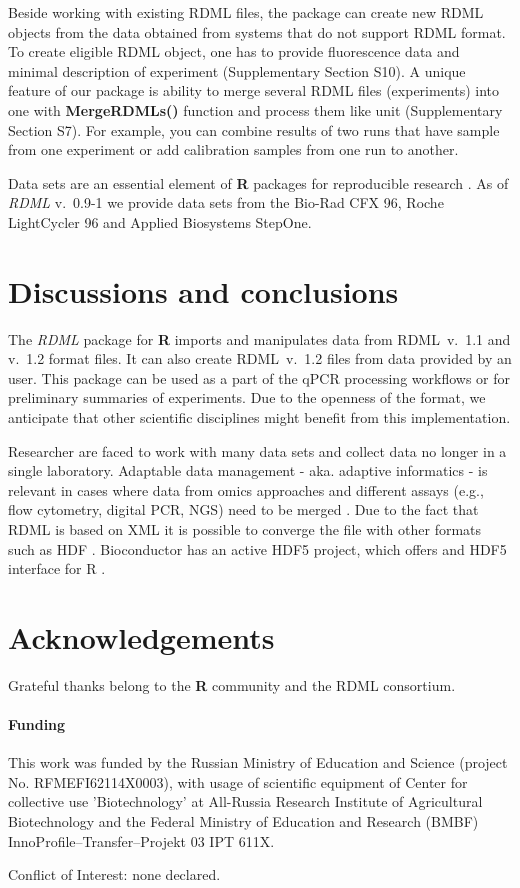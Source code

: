 \documentclass{bioinfo}
\begin{document}
	Beside working with existing RDML files, the package can create new RDML 
objects from the data obtained from systems that do not support RDML format. To 
create eligible RDML object, one has to provide fluorescence data and minimal 
description of experiment (Supplementary Section S10). A unique feature of our 
package is ability to merge several RDML files (experiments) into one with 
\textbf{MergeRDMLs()} function and process them like unit (Supplementary Section 
S7). For example, you can combine results of two runs that have sample from one 
experiment or add calibration samples from one run to another.

Data sets are an essential element of \textbf{R} packages for reproducible 
research \cite{roediger2015r}. As of \textit{RDML} v.~0.9-1 we provide data sets 
from the Bio-Rad CFX 96, Roche LightCycler 96 and Applied Biosystems StepOne.

\section{Discussions and conclusions}
	
	The \textit{RDML} package for \textbf{R} imports and manipulates data 
from RDML~v.~1.1 and v.~1.2 format files. It can also create RDML~v.~1.2 files 
from data provided by an user. This package can be used as a part of the qPCR 
processing workflows or for preliminary summaries of experiments. Due to the 
openness of the format, we anticipate that other scientific disciplines might 
benefit from this implementation.

Researcher are faced to work with many data sets and collect data no 
longer in a single laboratory. Adaptable data management - aka. adaptive 
informatics - is relevant in cases where data from omics approaches and 
different assays (e.g., flow cytometry, digital PCR, NGS) need to be merged 
\cite{baker_quantitative_2012}. Due to the fact that RDML is based on XML it is 
possible to converge the file with other formats such as HDF 
\cite{millard_adaptive_2011}. Bioconductor has an active HDF5 project, which 
offers and HDF5 interface for R \cite{Fischer_HDF5}.

\section{Acknowledgements}
Grateful thanks belong to the \textbf{R} community and the RDML consortium.
	
\paragraph{Funding\textcolon} This work was funded by the Russian 
Ministry of Education and Science (project No. RFMEFI62114X0003), with 
usage of scientific equipment of Center for collective use ’Biotechnology’ at 
All-Russia Research Institute of Agricultural Biotechnology and the Federal 
Ministry of Education and Research (BMBF) InnoProfile--Transfer--Projekt 03 IPT 
611X.
	
	
Conflict of Interest: none declared.

%
%
%
%
%
%

	
\end{document}
